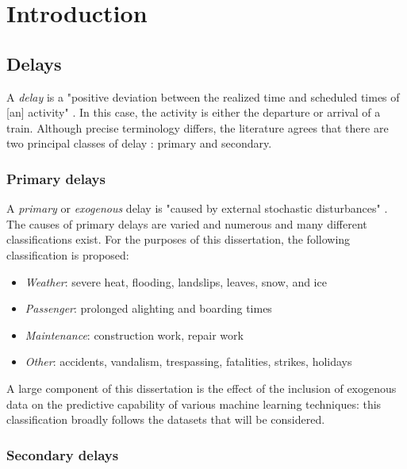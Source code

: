 \documentclass{article}
\begin{document}
\tableofcontents
\clearpage

\section{Introduction}

\subsection{Delays}

A \textit{delay} is a "positive deviation between the realized time and scheduled times of [an] activity" \cite{cerreto_nielsen_harrod_nielsen_2016}. In this case, the activity is either the departure or arrival of a train.  Although precise terminology differs, the literature agrees that there are two principal classes of delay \cite{olsson_haugland_2004}: primary and secondary.

\subsubsection{Primary delays}

A \textit{primary} or \textit{exogenous} delay is "caused by external stochastic disturbances" \cite{oneto_et_al_2016}. The causes of primary delays are varied and numerous \cite{berger_et_al_2011}\cite{cerreto_nielsen_harrod_nielsen_2016}\cite{milinkovic_et_al_2013}\cite{nr_delay_causes} and many different classifications exist. For the purposes of this dissertation, the following classification is proposed:

\begin{itemize}
	\item \textit{Weather}: severe heat, flooding, landslips, leaves, snow, and ice
	\item \textit{Passenger}: prolonged alighting and boarding times
	\item \textit{Maintenance}: construction work, repair work
	\item \textit{Other}: accidents, vandalism, trespassing, fatalities, strikes, holidays
\end{itemize}

A large component of this dissertation is the effect of the inclusion of exogenous data on the predictive capability of various machine learning techniques: this classification broadly follows the datasets that will
be considered.

\subsubsection{Secondary delays}
\end{document}
